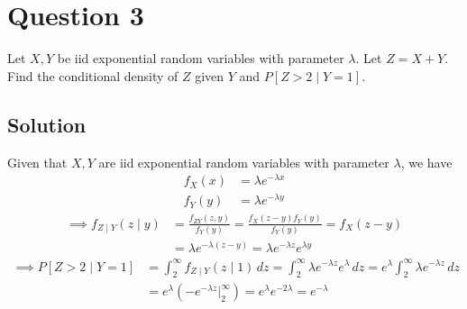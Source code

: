 \section*{Question 3}

Let \( X, Y \) be iid exponential random variables with parameter \( \lambda \).
Let \( Z=X+Y \).
Find the conditional density of \( Z \) given \( Y \) and \( P[Z>2 \mid Y=1] \).

\subsection*{Solution}

Given that \( X, Y \) are iid exponential random variables with parameter \( \lambda \), we have
\begin{align*}
    f_{X}(x)
     & =
    \lambda e^{-\lambda x}
    \\
    f_{Y}(y)
     & =
    \lambda e^{-\lambda y}
\end{align*}
\begin{align*}
    \implies
    f_{Z \mid Y}(z \mid y)
     & =
    \frac{f_{ZY}(z, y)}{f_{Y}(y)}
    =
    \frac{f_{X}(z-y) f_{Y}(y)}{f_{Y}(y)}
    =
    f_{X}(z-y)
    \\
     & =
    \lambda e^{-\lambda (z-y)}
    =
    \boxed{
        \lambda e^{-\lambda z} e^{\lambda y}
    }
\end{align*}
\begin{align*}
    \implies
    P[Z>2 \mid Y=1]
     & =
    \int_{2}^{\infty} f_{Z \mid Y}(z \mid 1) \, dz
    =
    \int_{2}^{\infty} \lambda e^{-\lambda z} e^{\lambda} \, dz
    =
    e^{\lambda} \int_{2}^{\infty} \lambda e^{-\lambda z} \, dz
    \\
     & =
    e^{\lambda} \left( -e^{-\lambda z} \Big|_{2}^{\infty} \right)
    =
    e^{\lambda} e^{-2 \lambda}
    =
    \boxed{
        e^{-\lambda}
    }
\end{align*}
